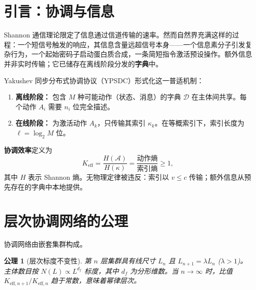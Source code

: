 \documentclass[12pt,a4paper]{article}
\newtheorem{axiom}{公理}
\begin{document}
	\tableofcontents
	\newpage
	
	\section{引言：协调与信息}
	\label{sec:intro}
	
	Shannon 通信理论限定了信息通过信道传输的速率。然而自然界充满这样的过程：一个短信号触发的响应，其信息含量远超信号本身——一个信息素分子引发复杂行为，一个起始密码子启动蛋白质合成，一条简短指令激活预设操作。额外信息并非实时传输；它已储存在离线阶段分发的\textbf{字典}中。
	
	Yakushev 同步分布式协调协议（YPSDC）形式化这一普适机制：
	\begin{enumerate}[label=(\roman*)]
		\item \textbf{离线阶段：} 包含 \(M\) 种可能动作（状态、消息）的字典 \(\mathcal{D}\) 在主体间共享。每个动作 \(A_i\) 需要 \(n_i\) 位完全描述。
		\item \textbf{在线阶段：} 为激活动作 \(A_k\)，只传输其索引 \(\kappa_k\)。在等概索引下，索引长度为 \(\ell = \log_2 M\) 位。
	\end{enumerate}
	\textbf{协调效率}定义为
	\begin{equation}
		\boxed{K_{\mathrm{eff}} = \frac{H(\mathcal{A})}{H(\kappa)} = \frac{\text{动作熵}}{\text{索引熵}} \ge 1},
		\label{eq:keff-def}
	\end{equation}
	其中 \(H\) 表示 Shannon 熵。无物理定律被违反：索引以 \(v \le c\) 传输；额外信息从预先存在的字典中本地提供。
	
	\begin{center}
	\end{center}
	
	\section{层次协调网络的公理}
	
	协调网络由嵌套集群构成。
	
	\begin{axiom}[层次标度不变性] \label{ax:A1}
		第 \(n\) 层集群具有线尺寸 \(L_n\) 且 \(L_{n+1} = \lambda L_n\) (\(\lambda > 1\))。主体数目按 \(N(L) \propto L^{d_f}\) 标度，其中 \(d_f\) 为分形维数。当 \(n \to \infty\) 时，比值 \(K_{\mathrm{eff},n+1}/K_{\mathrm{eff},n}\) 趋于常数，意味着幂律层次。
	\end{axiom}
	
\end{document}
